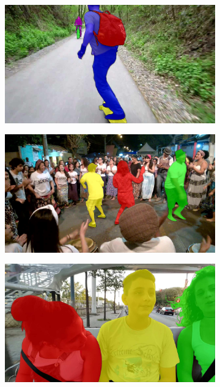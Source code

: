 \begin{figure}[h]
\centering
\begin{subfigure}{.25\textwidth}
  \includegraphics[width=1.\linewidth]{figures/davis_dataset/image_1.jpg}
\end{subfigure}%
\begin{subfigure}{.25\textwidth}
  \includegraphics[width=1.\linewidth]{figures/davis_dataset/image_2.jpg}
\end{subfigure}%
\begin{subfigure}{.25\textwidth}
  \includegraphics[width=1.\linewidth]{figures/davis_dataset/image_3.jpg}

\end{subfigure}
\end{figure}
